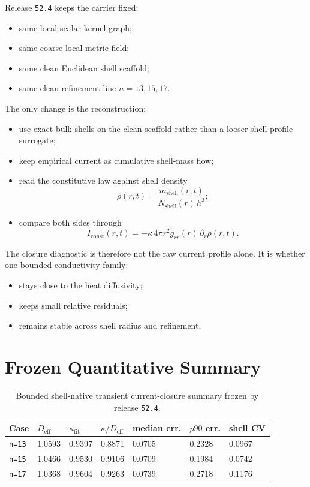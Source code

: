 \documentclass[11pt]{article}
\begin{document}
Release \texttt{52.4} keeps the carrier fixed:
\begin{itemize}
\item same local scalar kernel graph;
\item same coarse local metric field;
\item same clean Euclidean shell scaffold;
\item same clean refinement line \(n = 13, 15, 17\).
\end{itemize}

The only change is the reconstruction:
\begin{itemize}
\item use exact bulk shells on the clean scaffold rather than a looser shell-profile surrogate;
\item keep empirical current as cumulative shell-mass flow;
\item read the constitutive law against shell density
\[
\rho(r,t) = \frac{m_{\mathrm{shell}}(r,t)}{N_{\mathrm{shell}}(r)\, h^3};
\]
\item compare both sides through
\[
I_{\mathrm{const}}(r,t)
=
- \kappa \, 4\pi r^2 g_{rr}(r)\, \partial_r \rho(r,t).
\]
\end{itemize}

The closure diagnostic is therefore not the raw current profile alone. It is whether one bounded conductivity family:
\begin{itemize}
\item stays close to the heat diffusivity;
\item keeps small relative residuals;
\item remains stable across shell radius and refinement.
\end{itemize}

\section{Frozen Quantitative Summary}

\begin{table}[h!]
\centering
\begin{tabular}{@{}p{2.2cm}p{1.3cm}p{1.5cm}p{1.6cm}p{1.6cm}p{1.8cm}p{1.2cm}@{}}
\toprule
Case & \(D_{\mathrm{eff}}\) & \(\kappa_{\mathrm{fit}}\) & \(\kappa/D_{\mathrm{eff}}\) & median err. & \(p90\) err. & shell CV \\
\midrule
\texttt{n=13} & 1.0593 & 0.9397 & 0.8871 & 0.0705 & 0.2328 & 0.0967 \\
\texttt{n=15} & 1.0466 & 0.9530 & 0.9106 & 0.0709 & 0.1984 & 0.0742 \\
\texttt{n=17} & 1.0368 & 0.9604 & 0.9263 & 0.0739 & 0.2718 & 0.1176 \\
\bottomrule
\end{tabular}
\caption{Bounded shell-native transient current-closure summary frozen by release \texttt{52.4}.}
\end{table}
\end{document}
